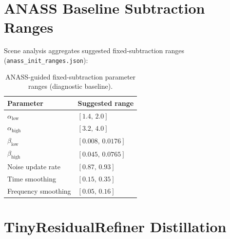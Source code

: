 \section{ANASS Baseline Subtraction Ranges}
\label{app:anass_hp}

Scene analysis aggregates suggested fixed-subtraction ranges (\texttt{anass\_init\_ranges.json}):

\begin{table}[H]
  \centering
  \caption{ANASS-guided fixed-subtraction parameter ranges (diagnostic baseline).}
  \label{tab:hp_anass}
  \begin{tabular}{ll}
    \toprule
    \textbf{Parameter} & \textbf{Suggested range} \\
    \midrule
    $\alpha_{\mathrm{low}}$  & $[1.4,\, 2.0]$ \\
    $\alpha_{\mathrm{high}}$ & $[3.2,\, 4.0]$ \\
    $\beta_{\mathrm{low}}$   & $[0.008,\, 0.0176]$ \\
    $\beta_{\mathrm{high}}$  & $[0.045,\, 0.0765]$ \\
    Noise update rate        & $[0.87,\, 0.93]$ \\
    Time smoothing           & $[0.15,\, 0.35]$ \\
    Frequency smoothing      & $[0.05,\, 0.16]$ \\
    \bottomrule
  \end{tabular}
\end{table}

\section{TinyResidualRefiner Distillation}
\label{app:distill_hp}

